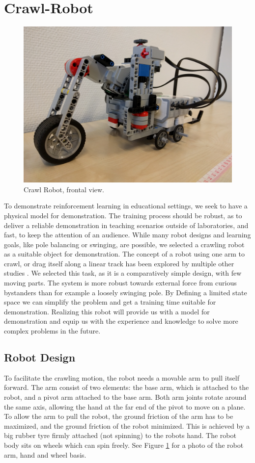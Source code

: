 \documentclass[11pt, a4paper]{article}
\begin{document}
\pagebreak
\section{Crawl-Robot}
\begin{figure}[H]
	\centering
	\includegraphics[width=0.6\linewidth]{images/crawl_robot}
	\caption{Crawl Robot, frontal view.}
	\label{fig:crawl_robot}
\end{figure}
To demonstrate reinforcement learning in educational settings, we seek to have a physical model for demonstration. The training process should be robust, as to deliver a reliable demonstration in teaching scenarios outside of laboratories, and fast, to keep the attention of an audience. While many robot designs and learning goals, like pole balancing or swinging, are possible, we selected a crawling robot as a suitable object for demonstration. The concept of a robot using one arm to crawl, or drag itself along a linear track has been explored by multiple other studies \cite{youtube_crawl2} \cite{youtube_crawl}. We selected this task, as it is a comparatively simple design, with few moving parts. The system is more robust towards external force from curious bystanders than for example a loosely swinging pole. By Defining a limited state space we can simplify the problem and get a training time suitable for demonstration. Realizing this robot will provide us with a model for demonstration  and equip us with the experience and knowledge to solve more complex problems in the future.


\subsection{Robot Design}
To facilitate the crawling motion, the robot needs a movable arm to pull itself forward. The arm consist of two elements: the base arm, which is attached to the robot, and a pivot arm attached to the base arm. Both arm joints rotate around the same axis, allowing the hand at the far end of the pivot to move on a plane. To allow the arm to pull the robot, the ground friction of the arm has to be maximized, and the ground friction of the robot minimized. This is achieved by a big rubber tyre firmly attached (not spinning) to the robots hand. The robot body sits on wheels which can spin freely. See Figure \ref{fig:crawl_robot} for a photo of the robot arm, hand and wheel basis.
\end{document}
